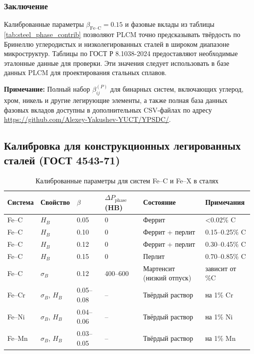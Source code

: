 \documentclass[12pt,a4paper]{article}
\begin{document}
	\subsubsection{Заключение}
	Калиброванные параметры $\beta_{\text{Fe–C}} = 0.15$ и фазовые вклады из таблицы \ref{tab:steel_phase_contrib} позволяют PLCM точно предсказывать твёрдость по Бринеллю углеродистых и низколегированных сталей в широком диапазоне микроструктур. Таблицы по ГОСТ Р 8.1038-2024 предоставляют необходимые эталонные данные для проверки. Эти значения следует использовать в базе данных PLCM для проектирования стальных сплавов.
	
	\vspace{0.2cm}
	\noindent
	\textbf{Примечание:} Полный набор $\beta_{ij}^{(P)}$ для бинарных систем, включающих углерод, хром, никель и другие легирующие элементы, а также полная база данных фазовых вкладов доступны в дополнительных CSV-файлах по адресу \url{https://github.com/Alexey-Yakushev-YUCT/YPSDC/}.
	
	\subsection{Калибровка для конструкционных легированных сталей (ГОСТ 4543-71)}
	\begin{longtable}{p{2.5cm} p{1.2cm} p{1.2cm} p{1.5cm} p{2.0cm} p{2.0cm}}
		\caption{Калиброванные параметры для систем Fe–C и Fe–X в сталях}\\
		\toprule
		\textbf{Система} & \textbf{Свойство} & $\beta$ & $\Delta P_{\text{phase}}$ (HB) & \textbf{Состояние} & \textbf{Примечания} \\
		\midrule
		Fe–C & $H_B$ & 0.05 & 0 & Феррит & <0.02\% C \\
		Fe–C & $H_B$ & 0.10 & 0 & Феррит + перлит & 0.15–0.25\% C \\
		Fe–C & $H_B$ & 0.12 & 0 & Феррит + перлит & 0.30–0.45\% C \\
		Fe–C & $H_B$ & 0.15 & 0 & Перлит & 0.70–0.85\% C \\
		Fe–C & $\sigma_B$ & 0.12 & 400–600 & Мартенсит (низкий отпуск) & зависит от \%C \\
		Fe–Cr & $\sigma_B$, $H_B$ & 0.05–0.08 & – & Твёрдый раствор & на 1\% Cr \\
		Fe–Ni & $\sigma_B$, $H_B$ & 0.04–0.06 & – & Твёрдый раствор & на 1\% Ni \\
		Fe–Mn & $\sigma_B$, $H_B$ & 0.03–0.05 & – & Твёрдый раствор & на 1\% Mn \\
		\bottomrule
	\end{longtable}
	
\end{document}
